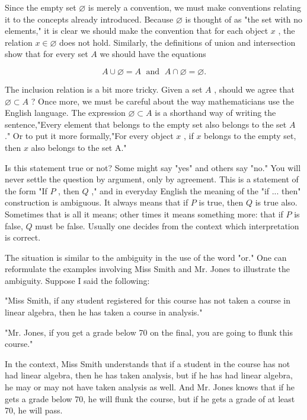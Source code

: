 \documentclass[10pt]{article}
\begin{document}
Since the empty set \(\varnothing\) is merely a convention, we must make conventions relating it to the concepts already introduced. Because \(\varnothing\) is thought of as "the set with no elements," it is clear we should make the convention that for each object \(x\) , the relation \(x \in  \varnothing\) does not hold. Similarly, the definitions of union and intersection show that for every set \(A\) we should have the equations

\[
A \cup  \varnothing  = A\;\text{ and }\;A \cap  \varnothing  = \varnothing .
\]

The inclusion relation is a bit more tricky. Given a set \(A\) , should we agree that \(\varnothing  \subset  A\) ? Once more, we must be careful about the way mathematicians use the English language. The expression \(\varnothing  \subset  A\) is a shorthand way of writing the sentence,"Every element that belongs to the empty set also belongs to the set \(A\) ." Or to put it more formally,"For every object \(x\) , if \(x\) belongs to the empty set, then \(x\) also belongs to the set A."

Is this statement true or not? Some might say "yes" and others say "no." You will never settle the question by argument, only by agreement. This is a statement of the form "If \(P\) , then \(Q\) ," and in everyday English the meaning of the "if ... then" construction is ambiguous. It always means that if \(P\) is true, then \(Q\) is true also. Sometimes that is all it means; other times it means something more: that if \(P\) is false, \(Q\) must be false. Usually one decides from the context which interpretation is correct.

The situation is similar to the ambiguity in the use of the word "or." One can reformulate the examples involving Miss Smith and Mr. Jones to illustrate the ambiguity. Suppose I said the following:

"Miss Smith, if any student registered for this course has not taken a course in linear algebra, then he has taken a course in analysis."

"Mr. Jones, if you get a grade below 70 on the final, you are going to flunk this course."

In the context, Miss Smith understands that if a student in the course has not had linear algebra, then he has taken analysis, but if he has had linear algebra, he may or may not have taken analysis as well. And Mr. Jones knows that if he gets a grade below 70, he will flunk the course, but if he gets a grade of at least 70, he will pass.
\end{document}
